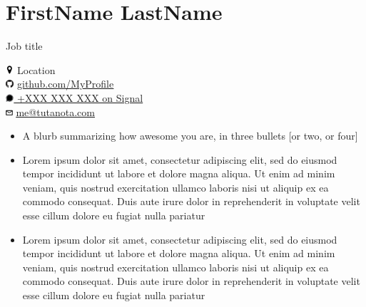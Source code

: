 \documentclass[12pt]{article}
\begin{document}
%
%
%
%
\noindent
\begin{minipage}[t]{0.66\textwidth}
\section*{\LARGE FirstName LastName}
\begin{LARGE}
Job title\\
\end{LARGE}
\end{minipage}
\hfill
\begin{minipage}[t]{0.33\textwidth}
\includegraphics[height=0.3cm]{map} Location\\
\includegraphics[height=0.3cm]{github} \href{https://github.com/MyProfile}{\underline{github.com/MyProfile}\\
\includegraphics[height=0.3cm]{signal} +XXX XXX XXX on Signal\\ %
\includegraphics[height=0.25cm]{mail}} \href{mailto:men@tutanota.com}{\underline{me@tutanota.com}}\\
\end{minipage}
\vspace*{-0.5cm}
%
%
\begin{itemize}
    \item A blurb summarizing how awesome you are, in three bullets [or two, or four]
    \item Lorem ipsum dolor sit amet, consectetur adipiscing elit, sed do eiusmod tempor incididunt ut labore et dolore magna aliqua. Ut enim ad minim veniam, quis nostrud exercitation ullamco laboris nisi ut aliquip ex ea commodo consequat. Duis aute irure dolor in reprehenderit in voluptate velit esse cillum dolore eu fugiat nulla pariatur
    \item Lorem ipsum dolor sit amet, consectetur adipiscing elit, sed do eiusmod tempor incididunt ut labore et dolore magna aliqua. Ut enim ad minim veniam, quis nostrud exercitation ullamco laboris nisi ut aliquip ex ea commodo consequat. Duis aute irure dolor in reprehenderit in voluptate velit esse cillum dolore eu fugiat nulla pariatur
\end{itemize}
\vspace*{-0.8cm}
%
%
\end{document}
